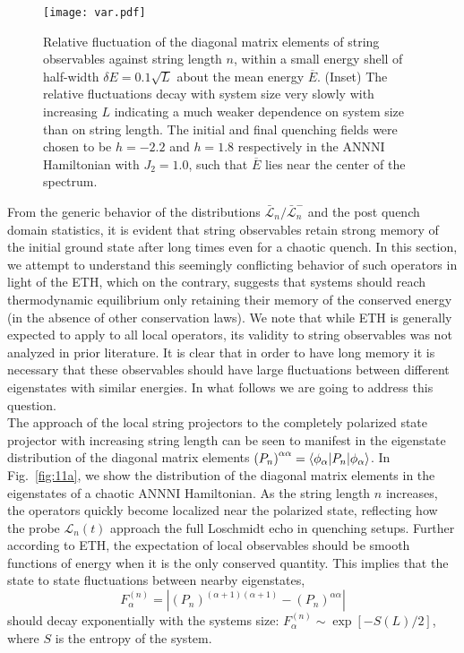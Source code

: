 \documentclass[aps,prx,twocolumn]{revtex4-2}
\begin{document}
\begin{figure}
	\centering
	\texttt{[image: var.pdf]}
	
	\caption{Relative fluctuation of the diagonal matrix elements of string observables against string length $n$, within a small energy shell of half-width $\delta E=0.1\sqrt{L}$ about the mean energy $\overline{E}$. (Inset) The relative fluctuations decay with system size very slowly with increasing $L$ indicating a much weaker dependence on system size than on string length. The initial and final quenching fields were chosen to be $h=-2.2$ and $h=1.8$ respectively in the ANNNI Hamiltonian with $J_2=1.0$, such that $\overline{E}$ lies near the center of the spectrum.}
	\label{fig:11c} 
\end{figure}
{From the generic behavior of the distributions $\bar{\mathcal{L}}_n/\bar{\mathcal{L}}_n^-$ and the post quench domain statistics, it is evident that string observables retain strong memory of the initial ground state after long times  {even for} a chaotic quench. In this section, we attempt to understand this seemingly conflicting behavior of such operators in light of the ETH,  which on the contrary,   {suggests that systems should reach thermodynamic equilibrium only retaining their memory of the conserved energy (in the absence of other conservation laws). We note that while ETH is generally expected to apply to all local operators,  its validity to string observables was not analyzed in prior literature.  It is clear that in order to have long memory it is necessary that these observables should have large fluctuations between different eigenstates with similar energies.  In what follows we are going to address this question.}\\

The approach of the local string projectors to the completely polarized state projector with increasing string length can be seen to manifest in the eigenstate distribution of the diagonal matrix elements $\left(P_n\right)^{\alpha\alpha}=\braket{\phi_{\alpha}|P_n|\phi_{\alpha}}$. In Fig.~\ref{fig:11a}, we show the distribution of the diagonal matrix elements in the eigenstates of a chaotic ANNNI Hamiltonian.  As the string length $n$ increases, the operators quickly become localized near the  {polarized} state,  reflecting how the probe $\mathcal{L}_n(t)$ approach the full Loschmidt echo in quenching setups. Further according to ETH,  the expectation of local observables  {should be} smooth functions of energy when it is the only conserved quantity. This implies that the state to state fluctuations between nearby eigenstates,
\begin{equation}
	F^{(n)}_{\alpha}=|\left(P_n\right)^{(\alpha+1)(\alpha+1)}-\left(P_n\right)^{\alpha\alpha}|
\end{equation}
should  {decay exponentially with the systems size: $F_\alpha^{(n)}\sim \exp[-S(L)/2]$,  where $S$ is the  entropy of the system.}\\

}
\end{document}
